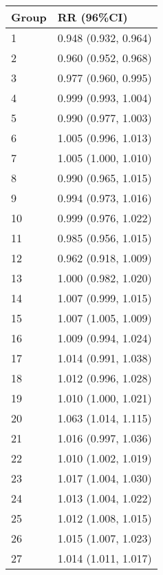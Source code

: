 \begin{tabular}{ll}
  \hline
Group & RR (96\%CI) \\ 
  \hline
   1 & 0.948 (0.932, 0.964) \\ 
     2 & 0.960 (0.952, 0.968) \\ 
     3 & 0.977 (0.960, 0.995) \\ 
     4 & 0.999 (0.993, 1.004) \\ 
     5 & 0.990 (0.977, 1.003) \\ 
     6 & 1.005 (0.996, 1.013) \\ 
     7 & 1.005 (1.000, 1.010) \\ 
     8 & 0.990 (0.965, 1.015) \\ 
     9 & 0.994 (0.973, 1.016) \\ 
    10 & 0.999 (0.976, 1.022) \\ 
    11 & 0.985 (0.956, 1.015) \\ 
    12 & 0.962 (0.918, 1.009) \\ 
    13 & 1.000 (0.982, 1.020) \\ 
    14 & 1.007 (0.999, 1.015) \\ 
    15 & 1.007 (1.005, 1.009) \\ 
    16 & 1.009 (0.994, 1.024) \\ 
    17 & 1.014 (0.991, 1.038) \\ 
    18 & 1.012 (0.996, 1.028) \\ 
    19 & 1.010 (1.000, 1.021) \\ 
    20 & 1.063 (1.014, 1.115) \\ 
    21 & 1.016 (0.997, 1.036) \\ 
    22 & 1.010 (1.002, 1.019) \\ 
    23 & 1.017 (1.004, 1.030) \\ 
    24 & 1.013 (1.004, 1.022) \\ 
    25 & 1.012 (1.008, 1.015) \\ 
    26 & 1.015 (1.007, 1.023) \\ 
    27 & 1.014 (1.011, 1.017) \\ 
   \hline
\end{tabular}

